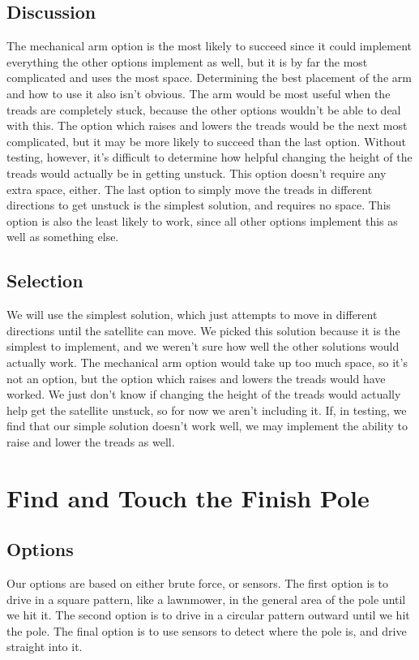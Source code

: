 \documentclass[10pt,serif,draftclsnofoot,onecolumn]{IEEEtran}
\begin{document}
\subsection{Discussion}
The mechanical arm option is the most likely to succeed since it could implement everything the other options implement as well, but it is by far the most complicated and uses the most space. Determining the best placement of the arm and how to use it also isn’t obvious. The arm would be most useful when the treads are completely stuck, because the other options wouldn’t be able to deal with this. The option which raises and lowers the treads would be the next most complicated, but it may be more likely to succeed than the last option. Without testing, however, it’s difficult to determine how helpful changing the height of the treads would actually be in getting unstuck. This option doesn’t require any extra space, either. The last option to simply move the treads in different directions to get unstuck is the simplest solution, and requires no space. This option is also the least likely to work, since all other options implement this as well as something else. 

\subsection{Selection}
We will use the simplest solution, which just attempts to move in different directions until the satellite can move. We picked this solution because it is the simplest to implement, and we weren’t sure how well the other solutions would actually work. The mechanical arm option would take up too much space, so it’s not an option, but the option which raises and lowers the treads would have worked. We just don’t know if changing the height of the treads would actually help get the satellite unstuck, so for now we aren’t including it. If, in testing, we find that our simple solution doesn’t work well, we may implement the ability to raise and lower the treads as well.

\section{Find and Touch the Finish Pole}

\subsection{Options}
Our options are based on either brute force, or sensors. The first option is to drive in a square pattern, like a lawnmower, in the general area of the pole until we hit it. The second option is to drive in a circular pattern outward until we hit the pole. The final option is to use sensors to detect where the pole is, and drive straight into it. 
\end{document}
